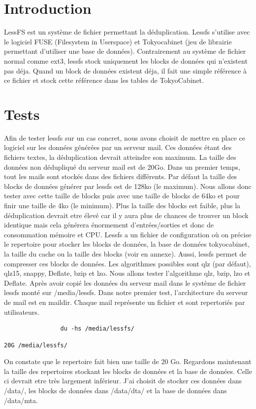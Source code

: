 \documentclass[a4paper]{report}
\begin{document}
		\section{Introduction}
		LessFS est un système de fichier permettant la déduplication. Lessfs s'utilise avec le logiciel FUSE (Filesystem in Userspace) et Tokyocabinet (jeu de librairie permettant d'utiliser une base de données). Contrairement au système de fichier normal comme ext3, lessfs stock uniquement les blocks de données qui n'existent pas déja. Quand un block de données existent déja, il fait une simple référence à ce fichier et stock cette référence dans les tables de TokyoCabinet.
		\section{Tests}
			Afin de tester lessfs sur un cas concret, nous avons choisit de mettre en place ce logiciel sur les données générées par un serveur mail. Ces données étant des fichiers textes, la déduplication devrait atteindre son maximum. La taille des données non dédupliqué du serveur mail est de 20Go. Dans un premier temps, tout les mails sont stockés dans des fichiers différents. Par défaut la taille des blocks de données générer par lessfs est de 128ko (le maximum). Nous allons donc tester avec cette taille de blocks puis avec une taille de blocks de 64ko et pour finir une taille de 4ko (le minimum). Plus la taille des blocks est faible, plus la déduplication devrait etre élevé car il y aura plus de chances de trouver un block identique mais cela générera énormement d'entrées/sorties et donc de consommation mémoire et CPU. Lessfs a un fichier de configuration où on précise le repertoire pour stocker les blocks de données, la base de données tokyocabinet, la taille du cache ou la taille des blocks (voir en annexe). Aussi, lessfs permet de compresser ces blocks de données. Les algorithmes possibles sont qlz (par défaut), qlz15, snappy, Deflate, bzip et lzo. Nous allons tester l'algorithme qlz, bzip, lzo et Deflate. Après avoir copié les données du serveur mail dans le système de fichier lessfs monté sur /media/lessfs. Dans notre premier test, l'architecture du serveur de mail est en maildir. Chaque mail représente un fichier et sont repertoriés par utilisateurs.\\
			\begin{lstlisting}
				du -hs /media/lessfs/
			\end{lstlisting}
			\begin{lstlisting}[backgroundcolor=\color{yellow}]
				20G	/media/lessfs/
			\end{lstlisting}
			On constate que le repertoire fait bien une taille de 20 Go. Regardons maintenant la taille des repertoires stockant les blocks de données et la base de données. Celle ci devrait etre très largement inférieur. J'ai choisit de stocker ces données dans /data/, les blocks de données dans /data/dta/ et la base de données dans /data/mta.\\
\end{document}
